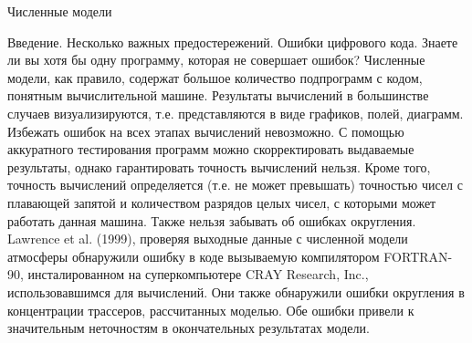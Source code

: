 \begin{chapter}{Численные модели}
\begin{section}{Введение. Несколько важных предостережений.}
Ошибки цифрового кода. Знаете ли вы хотя бы одну программу, которая не
совершает ошибок? Численные модели, как правило, содержат большое
количество подпрограмм с кодом, понятным вычислительной
машине. Результаты вычислений в большинстве случаев визуализируются,
т.е. представляются в виде графиков, полей, диаграмм. Избежать ошибок
на всех этапах вычислений невозможно. С помощью аккуратного
тестирования программ можно скорректировать выдаваемые результаты,
однако гарантировать точность вычислений нельзя. Кроме того, точность
вычислений определяется (т.е. не может превышать) точностью чисел с
плавающей запятой и количеством разрядов целых чисел, с которыми может
работать данная машина. Также нельзя забывать об ошибках
округления. Lawrence et al. (1999), проверяя выходные данные с
численной модели атмосферы обнаружили ошибку в коде вызываемую
компилятором FORTRAN-90, инсталированном на суперкомпьютере CRAY
Research, Inc., использовавшимся для вычислений. Они также обнаружили
ошибки округления в концентрации трассеров, рассчитанных моделью. Обе
ошибки привели к значительным неточностям в окончательных результатах
модели.
%
%


\end{section}
\end{chapter}
